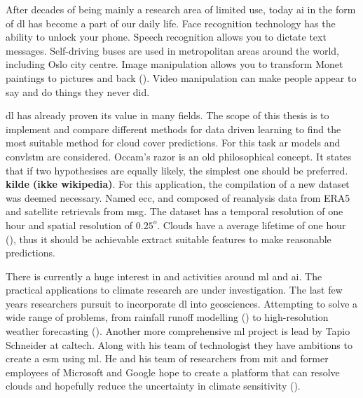 
After decades of being mainly a research area of limited use, today \acrfull{ai} in the form of \acrfull{dl} has become a part of our daily life. Face recognition technology has the ability to unlock your phone. Speech recognition allows you to dictate text messages. %
Self-driving buses are used in metropolitan areas around the world, including Oslo city centre.  %
Image manipulation allows you to transform Monet paintings to pictures and back (\cite{zhu2017_cycleGAN_monet_zebra}). Video manipulation can make people appear to say and do things they never did. 

\acrshort{dl} has already proven its value in many fields. The scope of this thesis is to implement and compare different methods for data driven learning to find the most suitable method for cloud cover predictions. For this task \acrfull{ar} models and \acrfull{convlstm} are considered. 
Occam's razor is an old philosophical concept. It states that if two hypothesises are equally likely, the simplest one should be preferred. \textbf{kilde (ikke wikipedia)}. For this application, the compilation of a new dataset was deemed necessary. Named \acrfull{ecc}, and composed of reanalysis data from ERA5 and satellite retrievals from \acrfull{msg}. The dataset has a temporal resolution of one hour and spatial resolution of $0.25^o$. Clouds have a average lifetime of one hour (\cite{lohmann2016}), thus it should be achievable extract suitable features to make reasonable predictions. 

There is currently a huge interest in and activities around \acrfull{ml} and \acrshort{ai}. The practical applications to climate research are under investigation. The last few years researchers pursuit to incorporate \acrshort{dl} into geosciences. Attempting to solve a wide range of problems, from rainfall runoff modelling (\cite{hess-23-5089-2019}) to  high-resolution weather forecasting (\cite{Rodrigues2018DeepDownscale:Forecast}). Another more comprehensive \acrshort{ml} project is lead by Tapio Schneider at \acrfull{caltech}. Along with his team of technologist they have ambitions to create a \acrfull{esm} using \acrshort{ml}. He and his team of researchers from \acrfull{mit} and former employees of Microsoft and Google hope to create a platform that can resolve clouds and hopefully reduce the uncertainty in climate sensitivity (\cite{Voosen2018ScienceIntelligence}).

